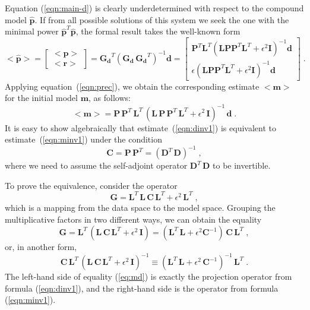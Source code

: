 Equation (\ref{eqn:main-d}) is clearly underdetermined with respect to
the compound model $\hat{\mathbf{p}}$. If from all possible solutions of
this system we seek the one with the minimal power $\hat{\mathbf{p}}^T
\hat{\mathbf{p}}$, the formal result takes the well-known form
\begin{equation}
<\!\!\hat{\mathbf{p}}\!\!> = \left[\begin{array}{c} 
<\!\!\mathbf{p}\!\!> \\ <\!\!\mathbf{r}\!\!>
\end{array} \right] =
\mathbf{G_d}^T \left(\mathbf{G_d}\,\mathbf{G_d}^T\right)^{-1} \mathbf{d} =
\left[\begin{array}{c}
\mathbf{P}^T \mathbf{L}^T  
\left(\mathbf{L P P}^T \mathbf{L}^T + \epsilon^2 \mathbf{I}\right)^{-1} \mathbf{d} \\
\epsilon 
\left(\mathbf{L P P}^T \mathbf{L}^T + \epsilon^2 \mathbf{I}\right)^{-1} \mathbf{d}
\end{array} \right]\;.
\label{eqn:dsol-i}
\end{equation}
Applying equation~(\ref{eqn:prec}), we obtain the corresponding
estimate $<\!\!\mathbf{m}\!\!>$ for the initial model $\mathbf{m}$, as
follows:
\begin{equation}
  \label{eqn:dinv1}
  <\!\!\mathbf{m}\!\!> =  \mathbf{P}\,\mathbf{P}^T\,\mathbf{L}^T\,\left(
    \mathbf{L}\,\mathbf{P}\,\mathbf{P}^T\,\mathbf{L}^T +
    \epsilon^2\,\mathbf{I}\right)^{-1}\, \mathbf{d}\;.
\end{equation}
It is easy to show algebraically that estimate~(\ref{eqn:dinv1}) 
is equivalent to estimate~(\ref{eqn:minv1}) under the condition
\begin{equation}
\mathbf{C} = \mathbf{P}\,\mathbf{P}^T = \left(\mathbf{D}^T\,\mathbf{D}\right)^{-1}\;,
\label{eqn:cond}
\end{equation}
where we need to assume the self-adjoint operator
$\mathbf{D}^T\,\mathbf{D}$ to be invertible.  

To prove the equivalence, consider the operator
\begin{equation}
\mathbf{G} = \mathbf{L}^T\,\mathbf{L}\,\mathbf{C}\,\mathbf{L}^T + \epsilon^2\,\mathbf{L}^T\;,
\label{eq:g}
\end{equation}
which is a mapping from the data space to the model space.
Grouping the multiplicative factors in two different ways, we can
obtain the equality
\begin{equation}
\mathbf{G} = \mathbf{L}^T\,\left(\mathbf{L}\,\mathbf{C}\,\mathbf{L}^T + 
\epsilon^2\,\mathbf{I}\right) = \left(\mathbf{L}^T\,\mathbf{L} + 
\epsilon^2 \mathbf{C}^{-1}\right)\,\mathbf{C}\,\mathbf{L}^T\;,
\label{eq:gmd}
\end{equation}
or, in another form,
\begin{equation}
\mathbf{C}\,\mathbf{L}^T\,\left(\mathbf{L}\,\mathbf{C}\,\mathbf{L}^T + 
\epsilon^2\,\mathbf{I}\right)^{-1} \equiv \left(\mathbf{L}^T\,\mathbf{L} + 
\epsilon^2\,\mathbf{C}^{-1}\right)^{-1}\,\mathbf{L}^T\;.
\label{eq:md}
\end{equation}
The left-hand side of equality (\ref{eq:md}) is exactly the projection
operator from formula (\ref{eqn:dinv1}), and the right-hand side is the
operator from formula (\ref{eqn:minv1}).

